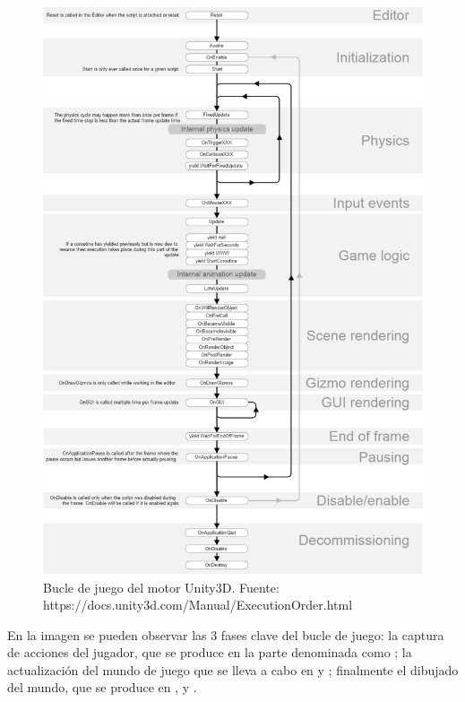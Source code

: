 \begin{figure}
\begin{center}
\includegraphics[scale=0.55]{imagenes/bucleUnity.png}
\caption{Bucle de juego del motor Unity3D. Fuente: https://docs.unity3d.com/Manual/ExecutionOrder.html}
\label{bucleUnity}
\end{center}
\end{figure}

En la imagen se pueden observar las 3 fases clave del bucle de juego: la captura de acciones del jugador, que se produce en la parte denominada como ; la actualización del mundo de juego que se lleva a cabo en  y ; finalmente el dibujado del mundo, que se produce en ,  y .


